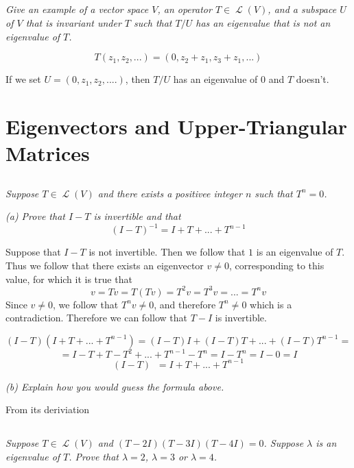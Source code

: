 \documentclass[11pt,oneside,titlepage]{book}
\DeclareMathOperator \map {\mathcal {L}}
\DeclareMathOperator \inv {^{-1}}
\begin{document}
\subsection{}

\textit{Give an example of a vector space $V$, an operator $T \in \map(V)$, and a subspace $U$
  of $V$ that is invariant under $T$ such that $T/U$ has an eigenvalue that is not an eigenvalue
  of $T$.}

$$T(z_1, z_2, ...) = (0, z_2 + z_1, z_3 + z_1, ...)$$

If we set $U = (0, z_1, z_2, ....)$, then $T/U$ has an eigenvalue of $0$ and $T$ doesn't.

\section{Eigenvectors and Upper-Triangular Matrices}

\subsection{}

\textit{Suppose $T \in \map(V)$ and there exists a positivee integer $n$ such that $T^n = 0$.}

\textit{(a) Prove that $I - T$ is invertible and that}
$$(I - T)^{-1} = I + T + ... + T^{n - 1}$$

Suppose that $I - T$ is not invertible. Then we follow that $1$ is an eigenvalue of $T$. Thus
we follow that there exists an eigenvector $v \neq 0$, corresponding to this value, for which it
is true that 
$$v = Tv = T(Tv) = T^2v = T^3v = ... = T^nv$$
Since $v \neq 0$, we follow that $T^nv \neq 0$, and therefore $T^n \neq 0$ which is a
contradiction. Therefore we can follow that $T - I$ is invertible.

$$(I - T)(I + T + ... + T^{n - 1}) = (I - T)I + (I - T)T + ... + (I - T)T^{n - 1} = $$
$$ = I - T + T - T^2 + ... + T^{n - 1}  - T^n =  I - T^n = I - 0 = I$$
$$(I - T)\inv = I + T + ... + T^{n - 1} $$

\textit{(b) Explain how you would guess the formula above.}

From its deriviation

\subsection{}

\textit{Suppose $T \in \map(V)$ and $(T - 2I)(T - 3I)(T - 4I) = 0$. Suppose $\lambda$
  is an eigenvalue of $T$. Prove that $\lambda = 2$, $\lambda = 3$ or $\lambda = 4$.}
\end{document}
